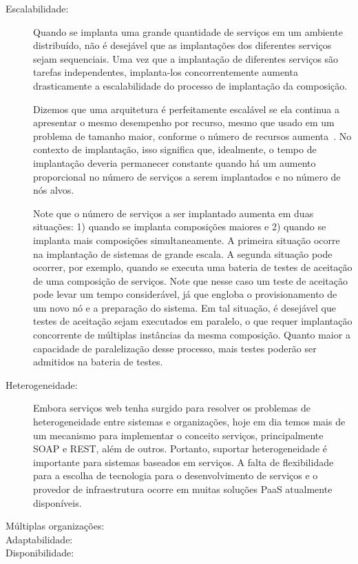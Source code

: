 \begin{description}
\item [Escalabilidade:]

Quando se implanta uma grande quantidade de serviços em um ambiente distribuído,
não é desejável que as implantações dos diferentes serviços sejam sequenciais.
Uma vez que a implantação de diferentes serviços são tarefas independentes,
implanta-los concorrentemente aumenta drasticamente a escalabilidade
do processo de implantação da composição.

Dizemos que uma arquitetura é perfeitamente escalável
se ela continua a apresentar o mesmo desempenho por recurso,
mesmo que usado em um problema de tamanho maior, conforme o número
de recursos aumenta~\cite{Quinn1994Scalability}.
No contexto de implantação, isso significa que, idealmente,
o tempo de implantação deveria permanecer constante quando há um
aumento proporcional no número de serviços a serem implantados e
no número de nós alvos.

Note que o número de serviços a ser implantado aumenta em duas situações:
1) quando se implanta composições maiores e 2) quando se implanta
mais composições simultaneamente. 
A primeira situação ocorre na implantação de sistemas de grande escala.
A segunda situação pode ocorrer, por exemplo,
quando se executa uma bateria de testes de aceitação de uma composição de serviços.
Note que nesse caso um teste de aceitação pode levar um tempo considerável,
já que engloba o provisionamento de um novo nó e a preparação do sistema.
Em tal situação, é desejável que testes de aceitação sejam executados em paralelo,
o que requer implantação concorrente de múltiplas instâncias da mesma composição.
Quanto maior a capacidade de paralelização desse processo,
mais testes poderão ser admitidos na bateria de testes.

\item [Heterogeneidade:]

Embora serviços web tenha surgido para resolver os problemas de heterogeneidade
entre sistemas e organizações, hoje em dia temos mais de um mecanismo para
implementar o conceito serviços, principalmente SOAP e REST, além de outros.
Portanto, suportar heterogeneidade é importante para sistemas baseados em serviços.
A falta de flexibilidade para a escolha de tecnologia para o desenvolvimento de serviços
e o provedor de infraestrutura ocorre em muitas soluções PaaS atualmente disponíveis.

\item [Múltiplas organizações:]

\item [Adaptabilidade:]

\item [Disponibilidade:]

\end{description}



